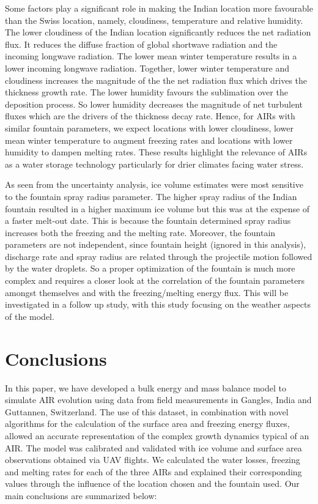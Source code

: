 \documentclass[utf8]{frontiersSCNS}
\begin{document}
Some factors play a significant role in making the Indian location more favourable than the Swiss location,
namely, cloudiness, temperature and relative humidity. The lower cloudiness of the Indian location significantly
reduces the net radiation flux. It reduces the diffuse fraction of global shortwave radiation and the incoming
longwave radiation. The lower mean winter temperature results in a lower incoming longwave radiation. Together,
lower winter temperature and cloudiness increases the magnitude of the the net radiation flux which drives the
thickness growth rate. The lower humidity favours the sublimation over the deposition process. So lower
humidity decreases the magnitude of net turbulent fluxes which are the drivers of the thickness decay rate.
Hence, for AIRs with similar fountain parameters, we expect locations with lower cloudiness, lower mean winter
temperature to augment freezing rates and locations with lower humidity to dampen melting rates. These results
highlight the relevance of AIRs as a water storage technology particularly for drier climates facing water
stress.

As seen from the uncertainty analysis, ice volume estimates were most sensitive to the fountain spray radius
parameter. The higher spray radius of the Indian fountain resulted in a higher maximum ice volume but this was
at the expense of a faster melt-out date. This is because the fountain determined spray radius increases both
the freezing and the melting rate. Moreover, the fountain parameters are not independent, since fountain height
(ignored in this analysis), discharge rate and spray radius are related through the projectile motion followed
by the water droplets. So a proper optimization of the fountain is much more complex and requires a closer look
at the correlation of the fountain parameters amongst themselves and with the freezing/melting energy flux. This
will be investigated in a follow up study, with this study focusing on the weather aspects of the model.

\section{Conclusions}

In this paper, we have developed a bulk energy and mass balance model to simulate AIR evolution using data from
field measurements in Gangles, India and Guttannen, Switzerland. The use of this dataset, in combination with
novel algorithms for the calculation of the surface area and freezing energy fluxes, allowed an accurate
representation of the complex growth dynamics typical of an AIR. The model was calibrated and validated with ice
volume and surface area observations obtained via UAV flights. We calculated the water losses, freezing and
melting rates for each of the three AIRs and explained their corresponding values through the influence of the
location chosen and the fountain used. Our main conclusions are summarized below:
\end{document}
